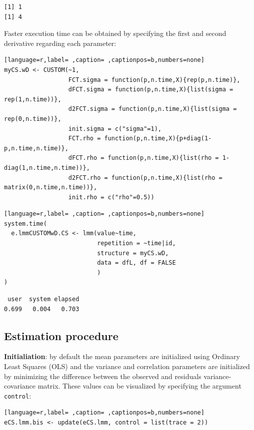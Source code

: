 \documentclass[12pt]{article}
\begin{document}
\begin{verbatim}
[1] 1
[1] 4
\end{verbatim}


Faster execution time can be obtained by specifying the first and
second derivative regarding each parameter:
\begin{lstlisting}[language=r,label= ,caption= ,captionpos=b,numbers=none]
myCS.wD <- CUSTOM(~1,
                  FCT.sigma = function(p,n.time,X){rep(p,n.time)},
                  dFCT.sigma = function(p,n.time,X){list(sigma = rep(1,n.time))},
                  d2FCT.sigma = function(p,n.time,X){list(sigma = rep(0,n.time))},
                  init.sigma = c("sigma"=1),
                  FCT.rho = function(p,n.time,X){p+diag(1-p,n.time,n.time)},
                  dFCT.rho = function(p,n.time,X){list(rho = 1-diag(1,n.time,n.time))},
                  d2FCT.rho = function(p,n.time,X){list(rho = matrix(0,n.time,n.time))},
                  init.rho = c("rho"=0.5))
\end{lstlisting}

\begin{lstlisting}[language=r,label= ,caption= ,captionpos=b,numbers=none]
system.time(
  e.lmmCUSTOMwD.CS <- lmm(value~time,
                          repetition = ~time|id,
                          structure = myCS.wD, 
                          data = dfL, df = FALSE
                          )
)
\end{lstlisting}

\begin{verbatim}
 user  system elapsed 
0.699   0.004   0.703
\end{verbatim}



\clearpage

\subsection{Estimation procedure}
\label{sec:org7b4ece1}

\textbf{Initialiation}: by default the mean parameters are initialized using
 Ordinary Least Squares (OLS) and the variance and correlation
 parameters are initialized by minimizing the difference between the
 observed and residuals variance-covariance matrix. These values can
 be visualized by specifying the argument \texttt{control}:
\begin{lstlisting}[language=r,label= ,caption= ,captionpos=b,numbers=none]
eCS.lmm.bis <- update(eCS.lmm, control = list(trace = 2))
\end{lstlisting}
\end{document}

